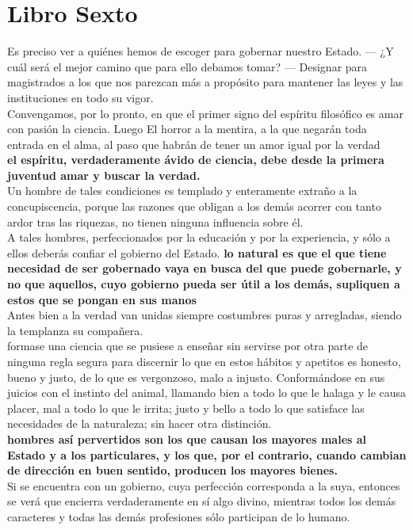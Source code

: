 \documentclass[10pt]{book}
\begin{document}
\chapter*{Libro Sexto}
Es preciso ver a quiénes hemos de escoger para gobernar nuestro Estado. — ¿Y cuál será el mejor camino que para ello debamos tomar? — Designar para magistrados a los que nos parezcan más a propósito para mantener las leyes y las instituciones en todo su vigor. \\
Convengamos, por lo pronto, en que el primer signo del espíritu filosófico es amar con pasión la ciencia. Luego El horror a la mentira, a la que negarán toda entrada en el alma, al paso que habrán de tener un amor igual por la verdad\\
\textbf{el espíritu, verdaderamente ávido de ciencia, debe desde la primera juventud amar y buscar la verdad.}\\
Un hombre de tales condiciones es templado y enteramente extraño a la concupiscencia, porque las razones que obligan a los demás acorrer con tanto ardor tras las riquezas, no tienen ninguna influencia sobre él.\\  
A tales hombres, perfeccionados por la educación y por la experiencia, y sólo a ellos deberás confiar el gobierno del Estado. 
\textbf{lo natural es que el que tiene necesidad de ser gobernado vaya en busca del que puede gobernarle, y no que aquellos, cuyo gobierno pueda ser útil a los demás, supliquen a estos que se pongan en sus manos}\\
Antes bien a la verdad van unidas siempre costumbres puras y arregladas, siendo la templanza su compañera. \\
formase una ciencia que se pusiese a enseñar sin servirse por otra parte de ninguna regla segura para discernir lo que en estos hábitos y apetitos es honesto, bueno y justo, de lo que es vergonzoso, malo a injusto. Conformándose en sus juicios con el instinto del animal, llamando bien a todo lo que le halaga y le causa placer, mal a todo lo que le irrita; justo y bello a todo lo que satisface las necesidades de la naturaleza; sin hacer otra distinción.\\
\textbf{hombres así pervertidos son los que causan los mayores males al Estado y a los particulares, y los que, por el contrario, cuando cambian de dirección en buen sentido, producen los mayores bienes.}\\
 Si se encuentra con un gobierno, cuya perfección corresponda a la suya, entonces se verá que encierra verdaderamente en sí algo divino, mientras todos los demás caracteres y todas las demás profesiones sólo participan de lo humano. \\
\end{document}
